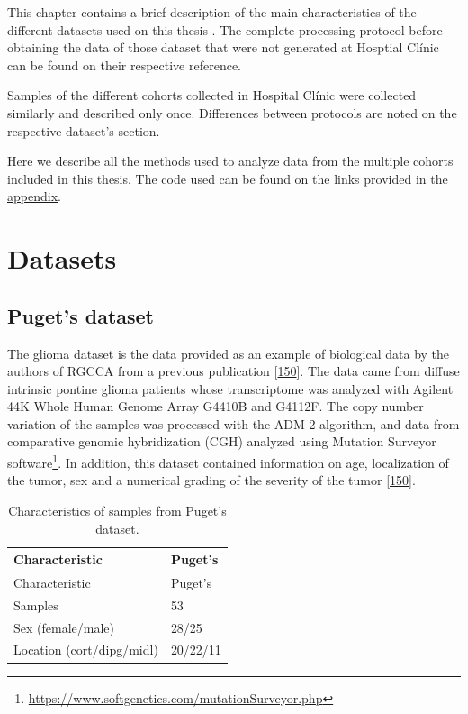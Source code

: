 \documentclass[
  a4paper,
]{book}
\DeclareRobustCommand{\href}[2]{#2\footnote{\url{#1}}}
\begin{document}
This chapter contains a brief description of the main characteristics of the different datasets used on this thesis .
The complete processing protocol before obtaining the data of those dataset that were not generated at Hosptial Clínic can be found on their respective reference.

Samples of the different cohorts collected in Hospital Clínic were collected similarly and described only once.
Differences between protocols are noted on the respective dataset's section.

Here we describe all the methods used to analyze data from the multiple cohorts included in this thesis.
The code used can be found on the links provided in the \protect\hyperlink{software}{appendix}.

\hypertarget{datasets}{%
\section{Datasets}\label{datasets}}

\hypertarget{methods-puget}{%
\subsection{Puget's dataset}\label{methods-puget}}

The glioma dataset is the data provided as an example of biological data by the authors of RGCCA from a previous publication {[}\protect\hyperlink{ref-puget2012}{150}{]}.
The data came from diffuse intrinsic pontine glioma patients whose transcriptome was analyzed with Agilent 44K Whole Human Genome Array G4410B and G4112F.
The copy number variation of the samples was processed with the ADM-2 algorithm, and data from comparative genomic hybridization (CGH) analyzed using \href{https://www.softgenetics.com/mutationSurveyor.php}{Mutation Surveyor software}.
In addition, this dataset contained information on age, localization of the tumor, sex and a numerical grading of the severity of the tumor {[}\protect\hyperlink{ref-puget2012}{150}{]}.

\begin{longtable}[]{@{}ll@{}}
\caption{\label{tab:Puget} Characteristics of samples from Puget's dataset.}\tabularnewline
\toprule
Characteristic & Puget's \\
\midrule
\endfirsthead
\toprule
Characteristic & Puget's \\
\midrule
\endhead
Samples & 53 \\
Sex (female/male) & 28/25 \\
Location (cort/dipg/midl) & 20/22/11 \\
\bottomrule
\end{longtable}
\end{document}
